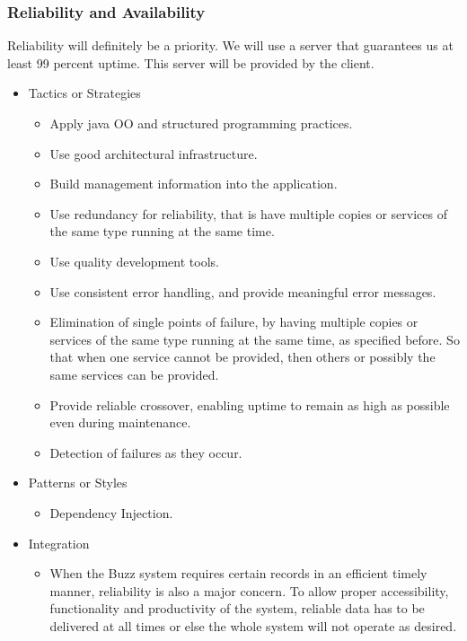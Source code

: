 \subsubsection{Reliability and Availability}
		Reliability will definitely be a priority. We will use a server that guarantees us at least 99 percent uptime. This server will be provided by the client.
		\begin{itemize}
	\item{Tactics or Strategies}
		\begin{itemize}
			\item Apply java OO and structured programming practices.
			\item Use good architectural infrastructure.
			\item Build management information into the application.
			\item Use redundancy for reliability, that is have multiple copies or services of the same type running at the same time.
			\item Use quality development tools.
			\item Use consistent error handling, and provide meaningful error messages.
			\item Elimination of single points of failure, by having multiple copies or services of the same type running at the same time, as specified before. So that when one service cannot be provided, then others or possibly the same services can be provided.
			\item Provide reliable crossover, enabling uptime to remain as high as possible even during maintenance.
			\item Detection of failures as they occur.
		\end{itemize}
	\item{Patterns or Styles}
		\begin{itemize}
			\item Dependency Injection.
		\end{itemize}
	\item{Integration}
		\begin{itemize}
			\item When the Buzz system requires certain records in an efficient timely manner, reliability is also a major concern. To allow proper accessibility, functionality and productivity of the system, reliable data has to be delivered at all times or else the whole system will not operate as desired.
		\end{itemize}
\end{itemize}
		
